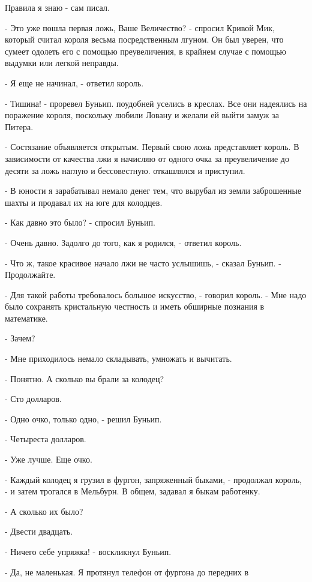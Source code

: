 Правила я знаю - сам писал.
\par- Это уже пошла первая ложь, Ваше Величество? - спросил Кривой 
Мик, который считал короля весьма посредственным лгуном. Он был 
уверен, что сумеет одолеть его с помощью преувеличения, в крайнем 
случае с помощью выдумки или легкой неправды.
\par- Я еще не начинал, - ответил король.
\par- Тишина! - проревел Буньип.
 поудобней уселись в креслах. Все они надеялись на 
поражение короля, поскольку любили Ловану и желали ей выйти замуж за 
Питера.
\par- Состязание объявляется открытым. Первый свою ложь представляет 
король. В зависимости от качества лжи я начисляю от одного очка за 
преувеличение до десяти за ложь наглую и бессовестную.
 откашлялся и приступил.
\par- В юности я зарабатывал немало денег тем, что вырубал из земли 
заброшенные шахты и продавал их на юге для колодцев.
\par- Как давно это было? - спросил Буньип.
\par- Очень давно. Задолго до того, как я родился, - ответил король.
\par- Что ж, такое красивое начало лжи не часто услышишь, - сказал 
Буньип. - Продолжайте.
\par- Для такой работы требовалось большое искусство, - говорил 
король. - Мне надо было сохранять кристальную честность и иметь 
обширные познания в математике.
\par- Зачем?
\par- Мне приходилось немало складывать, умножать и вычитать.
\par- Понятно. А сколько вы брали за колодец?
\par- Сто долларов.
\par- Одно очко, только одно, - решил Буньип.
\par- Четыреста долларов.
\par- Уже лучше. Еще очко.
\par- Каждый колодец я грузил в фургон, запряженный быками, - 
продолжал король, - и затем трогался в Мельбурн. В общем, задавал я 
быкам работенку.
\par- А сколько их было?
\par- Двести двадцать.
\par- Ничего себе упряжка! - воскликнул Буньип.
\par- Да, не маленькая. Я протянул телефон от фургона до передних в 
